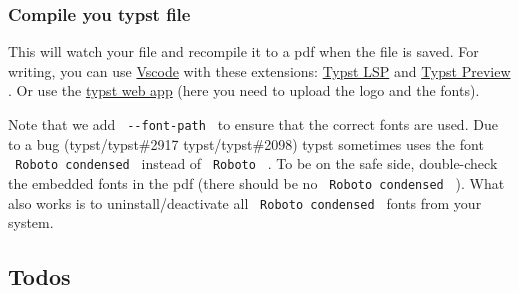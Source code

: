 \begin{Shaded}
\begin{Highlighting}[]
\OperatorTok{:}

\OperatorTok{:}\NormalTok{(}
\OperatorTok{:}\NormalTok{ [}
\NormalTok{  ]}\OperatorTok{,}
\OperatorTok{:} \OperatorTok{,}
\OperatorTok{:} 
\NormalTok{)}

\OperatorTok{=}
\end{Highlighting}
\end{Shaded}

\subsubsection{Compile you typst file}\label{compile-you-typst-file}

\begin{Shaded}
\begin{Highlighting}[]
 
\end{Highlighting}
\end{Shaded}

This will watch your file and recompile it to a pdf when the file is
saved. For writing, you can use
\href{https://code.visualstudio.com/}{Vscode} with these extensions:
\href{https://marketplace.visualstudio.com/items?itemName=nvarner.typst-lsp}{Typst
LSP} and
\href{https://marketplace.visualstudio.com/items?itemName=mgt19937.typst-preview}{Typst
Preview} . Or use the \href{https://typst.app/}{typst web app} (here you
need to upload the logo and the fonts).

Note that we add \texttt{\ -\/-font-path\ } to ensure that the correct
fonts are used. Due to a bug (typst/typst\#2917 typst/typst\#2098) typst
sometimes uses the font \texttt{\ Roboto\ condensed\ } instead of
\texttt{\ Roboto\ } . To be on the safe side, double-check the embedded
fonts in the pdf (there should be no \texttt{\ Roboto\ condensed\ } ).
What also works is to uninstall/deactivate all
\texttt{\ Roboto\ condensed\ } fonts from your system.

\subsection{Todos}\label{todos}

